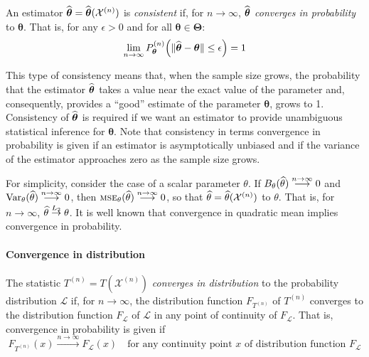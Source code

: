 An estimator $\widehat{\boldsymbol\theta} =
\widehat{\boldsymbol\theta}(\mathcal{X}^{(n)})$ is \emph{consistent} if, for $n
\rightarrow \infty$, $\widehat{\boldsymbol\theta}$ \emph{converges in
probability} to $\boldsymbol\theta$. That is, for any $\epsilon > 0$ and for
all $\boldsymbol\theta \in \boldsymbol\Theta$:
\[
    \lim_{n \rightarrow \infty} P_{\boldsymbol\theta}^{(n)} \left(
        \Vert\sthat{\boldsymbol\theta} - \boldsymbol\theta \Vert \leq \epsilon
        \right) = 1
\]

This type of consistency means that, when the sample size grows, the
probability that the estimator $\widehat{\boldsymbol\theta}$ takes a value near
the exact value of the parameter and, consequently, provides a “good” estimate
of the parameter $\boldsymbol\theta$, grows to 1. Consistency of                
$\widehat{\boldsymbol\theta}$ is required if we want an estimator to provide
unambiguous statistical inference for $\boldsymbol\theta$.
Note that consistency in terms convergence in probability is given if an
estimator is asymptotically unbiased and if the
variance of the estimator approaches zero as the sample size grows.

For simplicity, consider the case of a scalar parameter $\theta$. If            
$B_{\theta}(\widehat{\theta}) \stackrel{n \rightarrow \infty}{\longrightarrow} 0$
and $\mathrm{Var}_{\theta}(\widehat{\theta}) \stackrel{n \rightarrow
\infty}{\longrightarrow} 0$, then $\stsc{MSE}_{\theta}(\sthat{\theta})
\stackrel{n \rightarrow \infty}{\longrightarrow} 0$, so that $\widehat{\theta} =
\widehat{\theta}(\mathcal{X}^{(n)})$ \emph{} to $\theta$. That is, for $n
\rightarrow \infty$, $\widehat{\theta} \stackrel{L_2}{\rightarrow} \theta$. It is
well known that convergence in quadratic mean implies convergence in
probability.

\paragraph{Convergence in distribution}

The statistic $T^{(n)} = T(\mathcal{X}^{(n)})$ \emph{converges in distribution}
to the probability distribution $\mathcal{L}$ if, for $n \rightarrow \infty$,
the distribution function $F_{T^{(n)}}$ of $T^{(n)}$ converges to the
distribution function $F_\mathcal{L}$ of $\mathcal{L}$ in any point of
continuity of $F_\mathcal{L}$. That is, convergence in probability is
given if
\[
    F_{T^{(n)}}(x) \stackrel{n \rightarrow \infty}{\longrightarrow} F_\mathcal{L}(x)
    \quad\text{for any continuity point $x$ of distribution function $F_\mathcal{L}$}
\]


